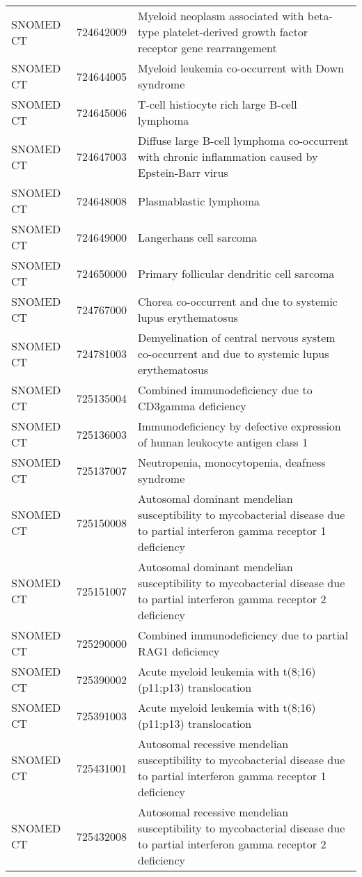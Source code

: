 \begin{table}[ht]
\begin{tabular}{lll}
  SNOMED CT & 724642009 & Myeloid neoplasm associated with beta-type platelet-derived growth factor receptor gene rearrangement \\ 
  SNOMED CT & 724644005 & Myeloid leukemia co-occurrent with Down syndrome \\ 
  SNOMED CT & 724645006 & T-cell histiocyte rich large B-cell lymphoma \\ 
  SNOMED CT & 724647003 & Diffuse large B-cell lymphoma co-occurrent with chronic inflammation caused by Epstein-Barr virus \\ 
  SNOMED CT & 724648008 & Plasmablastic lymphoma \\ 
  SNOMED CT & 724649000 & Langerhans cell sarcoma \\ 
  SNOMED CT & 724650000 & Primary follicular dendritic cell sarcoma \\ 
  SNOMED CT & 724767000 & Chorea co-occurrent and due to systemic lupus erythematosus \\ 
  SNOMED CT & 724781003 & Demyelination of central nervous system co-occurrent and due to systemic lupus erythematosus \\ 
  SNOMED CT & 725135004 & Combined immunodeficiency due to CD3gamma deficiency \\ 
  SNOMED CT & 725136003 & Immunodeficiency by defective expression of human leukocyte antigen class 1 \\ 
  SNOMED CT & 725137007 & Neutropenia, monocytopenia, deafness syndrome \\ 
  SNOMED CT & 725150008 & Autosomal dominant mendelian susceptibility to mycobacterial disease due to partial interferon gamma receptor 1 deficiency \\ 
  SNOMED CT & 725151007 & Autosomal dominant mendelian susceptibility to mycobacterial disease due to partial interferon gamma receptor 2 deficiency \\ 
  SNOMED CT & 725290000 & Combined immunodeficiency due to partial RAG1 deficiency \\ 
  SNOMED CT & 725390002 & Acute myeloid leukemia with t(8;16)(p11;p13) translocation \\ 
  SNOMED CT & 725391003 & Acute myeloid leukemia with t(8;16)(p11;p13) translocation \\ 
  SNOMED CT & 725431001 & Autosomal recessive mendelian susceptibility to mycobacterial disease due to partial interferon gamma receptor 1 deficiency \\ 
  SNOMED CT & 725432008 & Autosomal recessive mendelian susceptibility to mycobacterial disease due to partial interferon gamma receptor 2 deficiency \\ 

\end{tabular}
\end{table}
